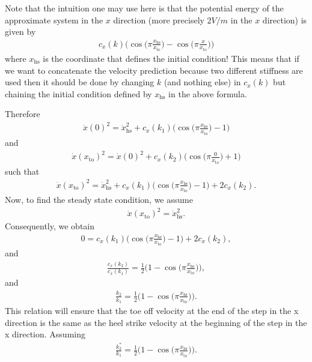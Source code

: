 \documentclass[journal,12pt,onecolumn]{IEEEtran}
\begin{document}
Note that the intuition one may use here is that the potential energy of the approximate system in the $x$ direction (more precisely $2V/m$ in the $x$ direction) is given by
\begin{align}
	 c_x(k)\Big(\cos\big(\pi \frac{x_{\text{hs}}}{x_{\text{to}}} \big) - \cos\big(\pi \frac{x}{x_{\text{to}}} \big)\Big)
\end{align}
where $x_{\text{hs}}$ is the coordinate that defines the initial condition! This means that if we want to concatenate the velocity prediction because two different stiffness are used then it should be done by changing $k$ (and nothing else) in $c_x(k)$ but chaining the initial condition defined by $x_{\text{hs}}$ in the above formula.

Therefore    
\begin{align}
	\dot{x}(0)^2 = \dot{x}_{\text{hs}}^2 + c_x(k_1)\Big(\cos\big(\pi \frac{x_{\text{hs}}}{x_{\text{to}}} \big) -1\Big)
\end{align}
and
\begin{align}
	\dot{x}(x_\text{to})^2 = \dot{x}(0)^2 + c_x(k_2)\Big(\cos\big(\pi \frac{0}{x_{\text{to}}} \big) +1 \Big)
\end{align}
such that
\begin{align}
	\dot{x}(x_\text{to})^2 = \dot{x}_{\text{hs}}^2 + c_x(k_1)\Big(\cos\big(\pi \frac{x_{\text{hs}}}{x_{\text{to}}} \big) -1\Big) + 2 c_x(k_2).
\end{align}
Now, to find the steady state condition, we assume
\begin{align}
	\dot{x}(x_\text{to})^2 = \dot{x}_{\text{hs}}^2.
\end{align}
Consequently, we obtain
\begin{align}
	0= c_x(k_1)\Big(\cos\big(\pi \frac{x_{\text{hs}}}{x_{\text{to}}} \big) -1\Big) + 2 c_x(k_2),
\end{align}
and
\begin{align}
	\frac{c_x(k_2)}{c_x(k_1)}= \frac{1}{2} \Big(1-\cos\big(\pi \frac{x_{\text{hs}}}{x_{\text{to}}} \big)\Big),
\end{align}
and
\begin{align}
	\frac{k_2}{k_1}= \frac{1}{2} \Big(1-\cos\big(\pi \frac{x_{\text{hs}}}{x_{\text{to}}} \big)\Big).
\end{align}
This relation will ensure that the toe off velocity at the end of the step in the x direction is the same as the heel strike velocity at the beginning of the step in the x direction. Assuming
\begin{align}
	\frac{k_2^*}{k_1}= \frac{1}{2} \Big(1-\cos\big(\pi \frac{x_{\text{hs}}}{x_{\text{to}}} \big)\Big).
\end{align}
\end{document}
